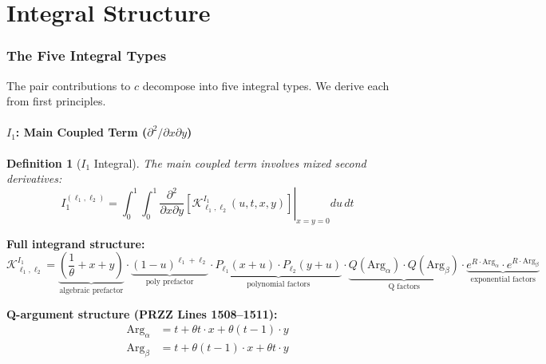 \documentclass[11pt]{article}
\newtheorem{definition}{Definition}
\begin{document}

\part{Integral Structure}

\section{The Five Integral Types}
\label{sec:integrals}

The pair contributions to $c$ decompose into five integral types. We derive each from first principles.

\subsection{$I_1$: Main Coupled Term ($\partial^2/\partial x \partial y$)}

\begin{definition}[$I_1$ Integral]
The main coupled term involves mixed second derivatives:
\begin{equation}
\boxed{
I_1^{(\ell_1,\ell_2)} = \int_0^1 \int_0^1 \left.\frac{\partial^2}{\partial x \partial y}\left[\mathcal{K}^{I_1}_{\ell_1,\ell_2}(u,t,x,y)\right]\right|_{x=y=0} du\, dt
}
\end{equation}
\end{definition}

\textbf{Full integrand structure:}
\begin{equation}
\mathcal{K}^{I_1}_{\ell_1,\ell_2} = \underbrace{\left(\frac{1}{\theta} + x + y\right)}_{\text{algebraic prefactor}} \cdot \underbrace{(1-u)^{\ell_1+\ell_2}}_{\text{poly prefactor}} \cdot \underbrace{P_{\ell_1}(x+u) \cdot P_{\ell_2}(y+u)}_{\text{polynomial factors}} \cdot \underbrace{Q(\text{Arg}_\alpha) \cdot Q(\text{Arg}_\beta)}_{\text{Q factors}} \cdot \underbrace{e^{R \cdot \text{Arg}_\alpha} \cdot e^{R \cdot \text{Arg}_\beta}}_{\text{exponential factors}}
\end{equation}

\textbf{Q-argument structure (PRZZ Lines 1508--1511):}
\begin{align}
\text{Arg}_\alpha &= t + \theta t \cdot x + \theta(t-1) \cdot y \\
\text{Arg}_\beta &= t + \theta(t-1) \cdot x + \theta t \cdot y
\end{align}
\end{document}
